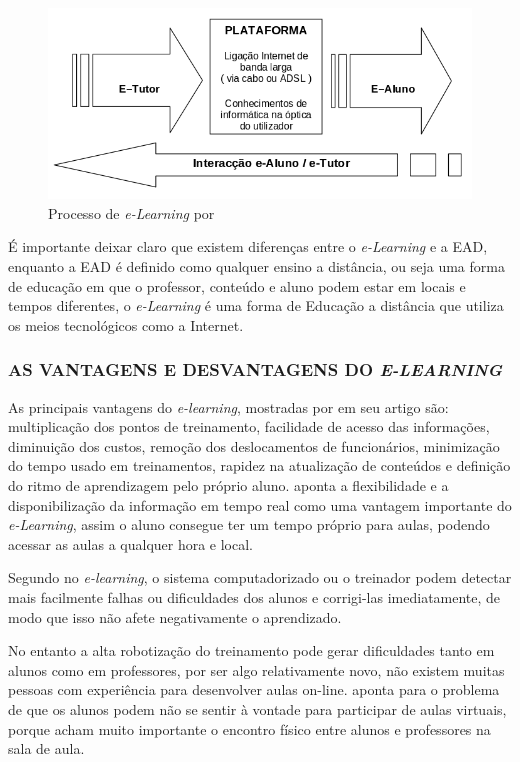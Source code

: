 \begin{figure}[h]
  \centering
  \includegraphics[keepaspectratio=true,scale=0.6]{figuras/e-learning-barbosa.png}
  \caption{Processo de \textit{e-Learning} por }
  \label{fig:e-learning-caracterização-barbosa}
\end{figure}


É importante deixar claro que existem diferenças entre o \textit{e-Learning} e a EAD, enquanto a EAD é definido como qualquer ensino a distância, ou seja uma forma de educação em que o professor, conteúdo e aluno podem estar em locais e tempos diferentes, o \textit{e-Learning} é uma forma de Educação a distância que utiliza os meios tecnológicos como a Internet.


\subsubsection{AS VANTAGENS E DESVANTAGENS DO \textit{E-LEARNING}}
As principais vantagens do \textit{e-learning}, mostradas por  em seu artigo são: multiplicação dos pontos de treinamento, facilidade de acesso das informações, diminuição dos custos, remoção dos deslocamentos de funcionários, minimização do tempo usado em treinamentos, rapidez na atualização de conteúdos e definição do ritmo de aprendizagem pelo próprio aluno.
 aponta a flexibilidade e a disponibilização da informação em tempo real como uma vantagem importante do \textit{e-Learning}, assim o aluno consegue ter um tempo próprio para aulas, podendo acessar as aulas a qualquer hora e local.

Segundo \cite[p.~6]{bernardo} no \textit{e-learning}, o sistema computadorizado ou o treinador podem detectar mais facilmente falhas ou dificuldades dos alunos e corrigi-las imediatamente, de modo que isso não afete negativamente o aprendizado.

No entanto a alta robotização do treinamento pode gerar dificuldades tanto em alunos como em professores, por ser algo relativamente novo, não existem muitas pessoas com experiência para desenvolver aulas on-line. \cite[p.~6]{bernardo} aponta para o problema de que os alunos podem não se sentir à vontade para participar de aulas virtuais, porque acham muito importante o encontro físico entre alunos e professores na sala de aula.

